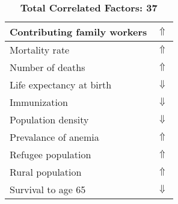 \documentclass[12pt,notitlepage,oneside]{report}
\begin{document}
\begin{table}[!htb]
\begin{tabular}{|l|l|}
Contributing family workers & $\Uparrow$\\ \hline
Mortality rate & $\Uparrow$\\ \hline
Number of deaths & $\Uparrow$\\ \hline
Life expectancy at birth & $\Downarrow$\\ \hline
Immunization & $\Downarrow$\\ \hline
Population density & $\Downarrow$\\ \hline
Prevalance of anemia & $\Uparrow$\\ \hline
Refugee population & $\Uparrow$\\ \hline
Rural population & $\Uparrow$\\ \hline
Survival to age 65 & $\Downarrow$\\ \hline
\end{tabular}
\caption*{\textbf{Total Correlated Factors: 37}}
\end{table}
\clearpage
\end{document}
